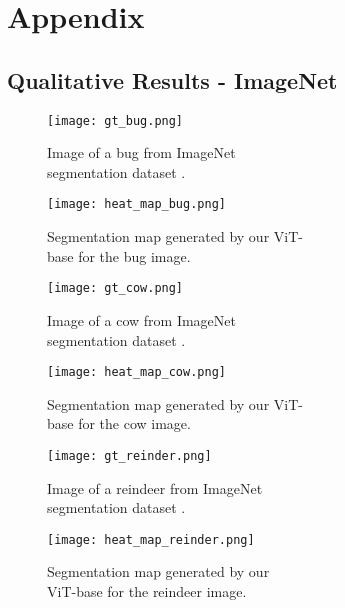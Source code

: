 \documentclass{article}
\begin{document}
\newpage
\section{Appendix}
\subsection*{Qualitative Results - ImageNet}
\label{ImageNet_results}

\begin{figure}[H]
  \texttt{[image: gt\_bug.png]}
  \caption{Image of a bug from ImageNet \\segmentation dataset \cite{imagenet-seg}.}\label{fig:gt_bug}
\endminipage\hfill
{}
  \texttt{[image: heat\_map\_bug.png]}
  \caption{Segmentation map generated by our ViT- \\base for the bug image.}\label{fig:map_bug}
\endminipage\hfill
\end{figure}

\begin{figure}[H]
  \texttt{[image: gt\_cow.png]}
  \caption{Image of a cow from ImageNet \\segmentation dataset \cite{imagenet-seg}.}\label{fig:gt_cow}
\endminipage\hfill
{}
  \texttt{[image: heat\_map\_cow.png]}
  \caption{Segmentation map generated by our ViT- \\base for the cow image.}\label{fig:map_cow}
\endminipage\hfill
\end{figure}


\begin{figure}[H]
  \texttt{[image: gt\_reinder.png]}
  \caption{Image of a reindeer from ImageNet \\segmentation dataset \cite{imagenet-seg}.}\label{fig:gt_reinder}
\endminipage\hfill
{}
  \texttt{[image: heat\_map\_reinder.png]}
  \caption{Segmentation map generated by our \\ViT-base for the reindeer image.}\label{fig:map_reinder}
\endminipage\hfill
\end{figure}
\end{document}
